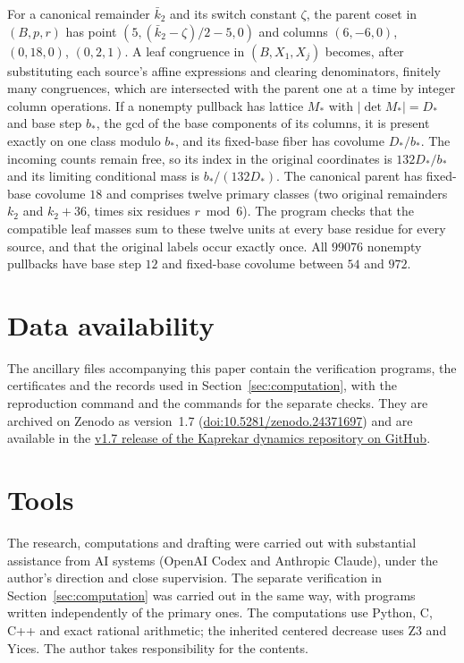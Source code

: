 \documentclass[11pt,reqno]{amsart}
\theoremstyle{remark}
\begin{document}
For a canonical remainder \(\bar k_2\) and its switch constant \(\zeta\), the parent coset in \((B,p,r)\) has point \((5,(\bar k_2-\zeta)/2-5,0)\) and columns \((6,-6,0)\), \((0,18,0)\), \((0,2,1)\). A leaf congruence in \((B,X_1,X_j)\) becomes, after substituting each source's affine expressions and clearing denominators, finitely many congruences, which are intersected with the parent one at a time by integer column operations. If a nonempty pullback has lattice \(M_*\) with \(|\det M_*|=D_*\) and base step \(b_*\), the gcd of the base components of its columns, it is present exactly on one class modulo \(b_*\), and its fixed-base fiber has covolume \(D_*/b_*\). The incoming counts remain free, so its index in the original coordinates is \(132D_*/b_*\) and its limiting conditional mass is \(b_*/(132D_*)\). The canonical parent has fixed-base covolume \(18\) and comprises twelve primary classes (two original remainders \(k_2\) and \(k_2+36\), times six residues \(r\bmod6\)). The program checks that the compatible leaf masses sum to these twelve units at every base residue for every source, and that the original labels occur exactly once. All \(99076\) nonempty pullbacks have base step \(12\) and fixed-base covolume between \(54\) and \(972\).

\section*{Data availability}
The ancillary files accompanying this paper contain the verification programs, the certificates and the records used in Section~\ref{sec:computation}, with the reproduction command and the commands for the separate checks. They are archived on Zenodo as version~1.7
(\href{https://doi.org/10.5281/zenodo.24371697}{doi:10.5281/zenodo.24371697}) and are available in the
\href{https://github.com/galyavin/kaprekar-dynamics/releases/tag/v1.7}{v1.7 release of the Kaprekar dynamics repository on GitHub}.

\section*{Tools}
The research, computations and drafting were carried out with substantial assistance from AI systems (OpenAI Codex and Anthropic Claude), under the author's direction and close supervision. The separate verification in Section~\ref{sec:computation} was carried out in the same way, with programs written independently of the primary ones. The computations use Python, C, C++ and exact rational arithmetic; the inherited centered decrease uses Z3 and Yices. The author takes responsibility for the contents.
\end{document}
